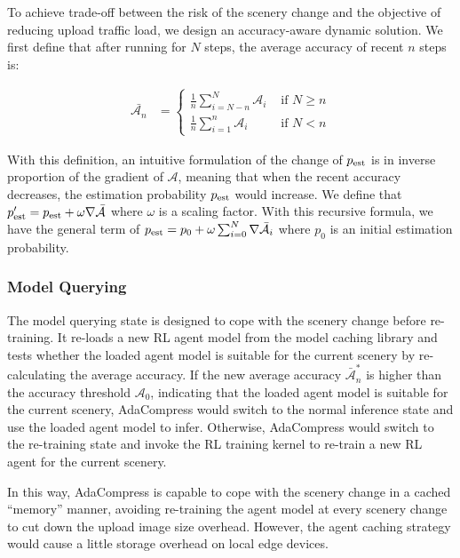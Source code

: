 To achieve trade-off between the risk of the scenery change and the objective of reducing upload traffic load, we design an accuracy-aware dynamic solution. We first define that after running for $ N $ steps, the average accuracy of recent $ n $ steps is: 

\begin{align*}
\bar{\mathcal{A}_n} &=
\begin{cases}
\frac{1}{n}\sum_{i=N-n}^{N} \mathcal{A}_i & \text{ if } N \geq n \\ 
\frac{1}{n}\sum_{i=1}^{n} \mathcal{A}_i & \text{ if } N < n 
\end{cases}
\end{align*}

With this definition, an intuitive formulation of the change of $ p_{\rm est} $ is in inverse proportion of the gradient of $ \mathcal{A} $, meaning that when the recent accuracy decreases, the estimation probability $ p_{\rm est} $ would increase. We define that $ p'_{\rm est} = p_{\rm est} + \omega \nabla \bar{\mathcal{A}} $ where $ \omega $ is a scaling factor. With this recursive formula, we have the general term of $p_{\rm est} = p_0 + \omega \sum_{i=0}^{N} \nabla \bar{\mathcal{A}_i} $ where $ p_0 $ is an initial estimation probability.

\subsubsection{Model Querying}

The model querying state is designed to cope with the scenery change before re-training. It re-loads a new RL agent model from the model caching library and tests whether the loaded agent model is suitable for the current scenery by re-calculating the average accuracy. If the new average accuracy $ \bar{\mathcal{A}}^*_n $ is higher than the accuracy threshold $ \mathcal{A}_0 $, indicating that the loaded agent model is suitable for the current scenery, AdaCompress would switch to the normal inference state and use the loaded agent model to infer. Otherwise, AdaCompress would switch to the re-training state and invoke the RL training kernel to re-train a new RL agent for the current scenery.

In this way, AdaCompress is capable to cope with the scenery change in a cached ``memory'' manner, avoiding re-training the agent model at every scenery change to cut down the upload image size overhead. However, the agent caching strategy would cause a little storage overhead on local edge devices.


